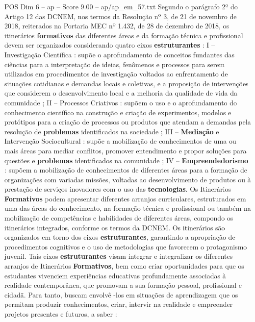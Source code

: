 \begin{textsample}{POS Dim 6 – ap – Score 9.00 – ap/ap\_em\_57.txt}
Segundo o parágrafo 2º do Artigo 12 das DCNEM, nos termos da Resolução nº 3, de 21 de novembro de 2018, reiterados na Portaria MEC nº 1.432, de 28 de dezembro de 2018, os itinerários \textbf{formativos} das diferentes áreas e da formação técnica e profissional devem ser organizados considerando quatro eixos \textbf{estruturantes} : I – Investigação Científica : supõe o aprofundamento de conceitos fundantes das ciências para a interpretação de ideias, fenômenos e processos para serem utilizados em procedimentos de investigação voltados ao enfrentamento de situações cotidianas e demandas locais e coletivas, e a proposição de intervenções que considerem o desenvolvimento local e a melhoria da qualidade de vida da comunidade ; II – Processos Criativos : supõem o uso e o aprofundamento do conhecimento científico na construção e criação de experimentos, modelos e protótipos para a criação de processos ou produtos que atendam a demandas pela resolução de \textbf{problemas} identificados na sociedade ; III – \textbf{Mediação} e Intervenção Sociocultural : supõe a mobilização de conhecimentos de uma ou mais áreas para mediar conflitos, promover entendimento e propor soluções para questões e \textbf{problemas} identificados na comunidade ; IV – \textbf{Empreendedorismo} : supõem a mobilização de conhecimentos de diferentes áreas para a formação de organizações com variadas missões, voltadas ao desenvolvimento de produtos ou à prestação de serviços inovadores com o uso das \textbf{tecnologias}.
Os Itinerários \textbf{Formativos} podem apresentar diferentes arranjos curriculares, estruturados em uma das áreas do conhecimento, na formação técnica e profissional ou também na mobilização de competências e habilidades de diferentes áreas, compondo os itinerários integrados, conforme os termos da DCNEM.
Os itinerários são organizados em torno dos eixos \textbf{estruturantes}, garantindo a apropriação de procedimentos cognitivos e o uso de metodologias que favorecem o protagonismo juvenil.
Tais eixos \textbf{estruturantes} visam integrar e integralizar os diferentes arranjos de Itinerários \textbf{Formativos}, bem como criar oportunidades para que os estudantes vivenciem experiências educativas profundamente associadas à realidade contemporânea, que promovam a sua formação pessoal, profissional e cidadã.
Para tanto, buscam envolvê -los em situações de aprendizagem que os permitam produzir conhecimentos, criar, intervir na realidade e empreender projetos presentes e futuros, a saber :

\end{textsample}

